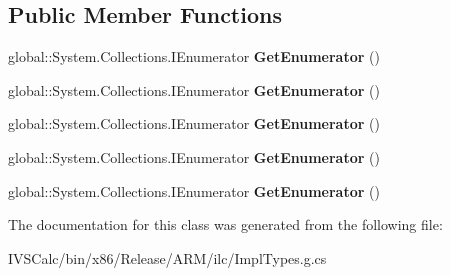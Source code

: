 \subsection*{Public Member Functions}
\begin{DoxyCompactItemize}
\item 
\mbox{\label{class_system_1_1_collections_1_1_generic_1_1_i_enumerable___a___system___guid___v_______impl_1_1_dynamic_r_c_w_adapter_class_aa68caf3529aa2951d6be7bfbd8f75e92}} 
global\+::\+System.\+Collections.\+I\+Enumerator {\bfseries Get\+Enumerator} ()
\item 
\mbox{\label{class_system_1_1_collections_1_1_generic_1_1_i_enumerable___a___system___guid___v_______impl_1_1_dynamic_r_c_w_adapter_class_aa68caf3529aa2951d6be7bfbd8f75e92}} 
global\+::\+System.\+Collections.\+I\+Enumerator {\bfseries Get\+Enumerator} ()
\item 
\mbox{\label{class_system_1_1_collections_1_1_generic_1_1_i_enumerable___a___system___guid___v_______impl_1_1_dynamic_r_c_w_adapter_class_aa68caf3529aa2951d6be7bfbd8f75e92}} 
global\+::\+System.\+Collections.\+I\+Enumerator {\bfseries Get\+Enumerator} ()
\item 
\mbox{\label{class_system_1_1_collections_1_1_generic_1_1_i_enumerable___a___system___guid___v_______impl_1_1_dynamic_r_c_w_adapter_class_aa68caf3529aa2951d6be7bfbd8f75e92}} 
global\+::\+System.\+Collections.\+I\+Enumerator {\bfseries Get\+Enumerator} ()
\item 
\mbox{\label{class_system_1_1_collections_1_1_generic_1_1_i_enumerable___a___system___guid___v_______impl_1_1_dynamic_r_c_w_adapter_class_aa68caf3529aa2951d6be7bfbd8f75e92}} 
global\+::\+System.\+Collections.\+I\+Enumerator {\bfseries Get\+Enumerator} ()
\end{DoxyCompactItemize}


The documentation for this class was generated from the following file\+:\begin{DoxyCompactItemize}
\item 
I\+V\+S\+Calc/bin/x86/\+Release/\+A\+R\+M/ilc/Impl\+Types.\+g.\+cs\end{DoxyCompactItemize}

